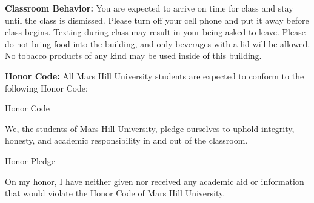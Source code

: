 \documentclass[12pt]{article}
\begin{document}
\vspace{.1 in}
\noindent\textbf{Classroom Behavior:}
You are expected to arrive on time for class and stay until the class is dismissed.  Please turn off your cell phone and put it away before class begins. Texting during class may result in your being asked to leave. Please do not bring food into the building, and only beverages with a lid will be allowed. No tobacco products of any kind may be used inside of this building.

\vspace{.1 in}
\noindent\textbf{Honor Code:}
 All Mars Hill University students are expected to conform to the following Honor Code:

\begin{center}Honor Code\end{center}
	We, the students of Mars Hill University, pledge ourselves to uphold integrity, honesty,
and academic responsibility in and out of the classroom.

\begin{center}Honor Pledge\end{center}
	On my honor, I have neither given nor received any academic aid or information
	that would violate the Honor Code of Mars Hill University.

\newpage
\end{document}
